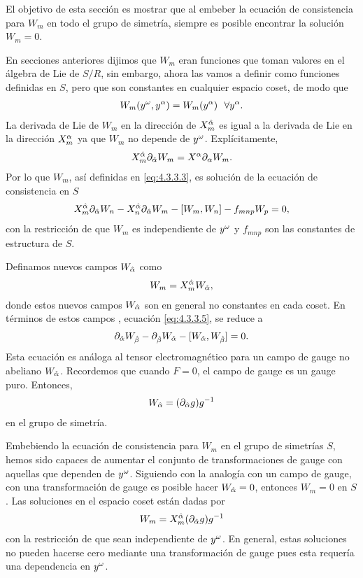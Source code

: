El objetivo de esta sección es mostrar que al embeber la ecuación de consistencia para $W_m$ en todo el grupo de simetría, siempre es posible encontrar la solución $W_m=0$.

En secciones anteriores dijimos que $W_m$ eran funciones que toman valores en el álgebra de Lie de $S/R$, sin embargo, ahora las vamos a definir como funciones definidas en $S$, pero que son constantes en cualquier espacio coset, de modo que
\begin{align}
	W_m(y^\omega,y^\alpha) = W_m(y^\alpha) \ \ \forall y^\alpha. \label{eq:4.3.3.3}
\end{align}
La derivada de Lie de $W_m$ en la dirección de $X^{\hat{\alpha}}_m$ es igual a la derivada de Lie en la dirección $X^\alpha_m$ ya que $W_m$ no depende de $y^\omega$. Explícitamente,
\begin{align}
	X^{\hat{\alpha}}_m\partial_{\hat{\alpha}}W_m = X^\alpha\partial_\alpha W_m.
\end{align}
Por lo que $W_m$, así definidas en \eqref{eq:4.3.3.3}, es solución de la ecuación de consistencia en $S$
\begin{align}
	X^{\hat{\alpha}}_m\partial_{\hat{\alpha}}W_n-X^{\hat{\alpha}}_n\partial_{\hat{\alpha}}W_m-[W_m,W_n]-f_{mnp}W_p=0, \label{eq:4.3.3.5}
\end{align}
con la restricción de que $W_m$ es independiente de $y^\omega$ y $f_{mnp}$ son las constantes de estructura de $S$.

Definamos nuevos campos $W_{\hat{\alpha}}$ como 
\begin{align}
	W_m = X^{\hat{\alpha}}_mW_{\hat{\alpha}},
\end{align}
donde estos nuevos campos $W_{\hat{\alpha}}$ son en general no constantes en cada coset. En términos de estos campos , ecuación \eqref{eq:4.3.3.5}, se reduce a
\begin{align}
	\partial_{\hat{\alpha}}W_{\hat\beta}-\partial_{\hat\beta}W_{\hat{\alpha}}-[W_{\hat{\alpha}},W_{\hat\beta}]=0.
\end{align}
Esta ecuación es análoga al tensor electromagnético para un campo de gauge no abeliano $W_{\hat{\alpha}}$. Recordemos que cuando $F=0$, el campo de gauge es un gauge puro. Entonces,
\begin{align}
	W_{\hat{\alpha}} = (\partial_{\hat{\alpha}}g)g^{-1}
\end{align}
en el grupo de simetría.

Embebiendo la ecuación de consistencia para $W_m$ en el grupo de simetrías $S$, hemos sido capaces de aumentar el conjunto de transformaciones de gauge con aquellas que dependen de $y^\omega$. Siguiendo con la analogía con un campo de gauge, con una transformación de gauge es posible hacer $W_{\hat{\alpha}}=0$, entonces $W_m=0$ en $S$. Las soluciones en el espacio coset están dadas por
\begin{align}
	W_m = X^{\hat{\alpha}}_m(\partial_{\hat{\alpha}}g)g^{-1}
\end{align}
con la restricción de que sean independiente de $y^\omega$. En general, estas soluciones no pueden hacerse cero mediante una transformación de gauge pues esta requería una dependencia en $y^\omega$.

